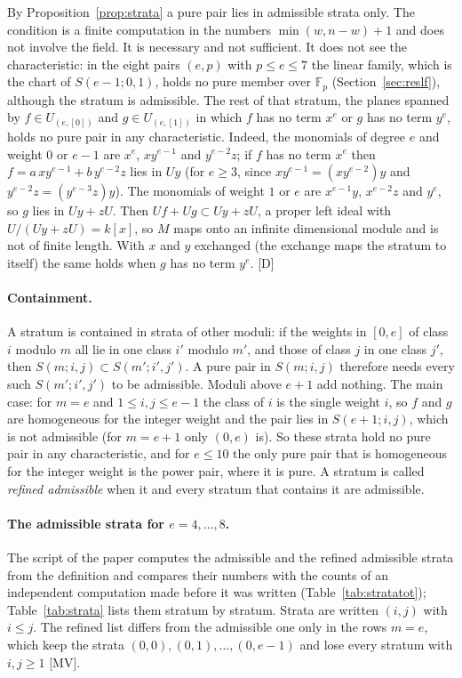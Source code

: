 \documentclass[11pt]{article}
\theoremstyle{definition}
\theoremstyle{remark}
\newcommand{\F}{\mathbb{F}}
\begin{document}
By Proposition~\ref{prop:strata} a pure pair lies in admissible strata only. The condition is a finite computation in the numbers $\min(w,n-w)+1$ and does not involve the field. It is necessary and not sufficient. It does not see the characteristic: in the eight pairs $(e,p)$ with $p\le e\le7$ the linear family, which is the chart of $S(e-1;0,1)$, holds no pure member over $\F_p$ (Section~\ref{sec:reslf}), although the stratum is admissible. The rest of that stratum, the planes spanned by $f\in U_{(e,[0])}$ and $g\in U_{(e,[1])}$ in which $f$ has no term $x^e$ or $g$ has no term $y^e$, holds no pure pair in any characteristic. Indeed, the monomials of degree $e$ and weight $0$ or $e-1$ are $x^e$, $xy^{e-1}$ and $y^{e-2}z$; if $f$ has no term $x^e$ then $f=a\,xy^{e-1}+b\,y^{e-2}z$ lies in $Uy$ (for $e\ge3$, since $xy^{e-1}=(xy^{e-2})y$ and $y^{e-2}z=(y^{e-3}z)y$). The monomials of weight $1$ or $e$ are $x^{e-1}y$, $x^{e-2}z$ and $y^e$, so $g$ lies in $Uy+zU$. Then $Uf+Ug\subset Uy+zU$, a proper left ideal with $U/(Uy+zU)=k[x]$, so $M$ maps onto an infinite dimensional module and is not of finite length. With $x$ and $y$ exchanged (the exchange maps the stratum to itself) the same holds when $g$ has no term $y^e$. [D]

\paragraph{Containment.} A stratum is contained in strata of other moduli: if the weights in $[0,e]$ of class $i$ modulo $m$ all lie in one class $i'$ modulo $m'$, and those of class $j$ in one class $j'$, then $S(m;i,j)\subset S(m';i',j')$. A pure pair in $S(m;i,j)$ therefore needs every such $S(m';i',j')$ to be admissible. Moduli above $e+1$ add nothing. The main case: for $m=e$ and $1\le i,j\le e-1$ the class of $i$ is the single weight $i$, so $f$ and $g$ are homogeneous for the integer weight and the pair lies in $S(e+1;i,j)$, which is not admissible (for $m=e+1$ only $(0,e)$ is). So these strata hold no pure pair in any characteristic, and for $e\le10$ the only pure pair that is homogeneous for the integer weight is the power pair, where it is pure. A stratum is called \emph{refined admissible} when it and every stratum that contains it are admissible.

\paragraph{The admissible strata for $e=4,\dots,8$.} The script of the paper computes the admissible and the refined admissible strata from the definition and compares their numbers with the counts of an independent computation made before it was written (Table~\ref{tab:stratatot}); Table~\ref{tab:strata} lists them stratum by stratum. Strata are written $(i,j)$ with $i\le j$. The refined list differs from the admissible one only in the rows $m=e$, which keep the strata $(0,0),(0,1),\dots,(0,e-1)$ and lose every stratum with $i,j\ge1$ [MV].
\end{document}
